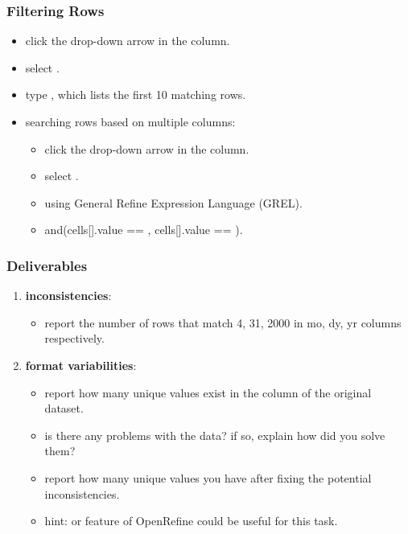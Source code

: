 \documentclass{beamer}					%
\begin{document}
\begin{frame}[c]
\frametitle{Filtering Rows}
\begin{itemize}
\item click the drop-down arrow in the  column.
\item select \say{\textcolor{red}{Text Filter}}.
\item type , which lists the first 10 matching rows.
\item searching rows based on multiple columns:
\begin{itemize}
\item click the drop-down arrow in the  column.
\item select \say{\textcolor{red}{Facet\textgreater Custom text facet...}}.
\item using General Refine Expression Language (GREL).
\item and(cells[].value == , cells[].value == ).
\end{itemize}
\end{itemize}
\end{frame}

 \begin{frame}[c]
 \frametitle{Deliverables}
 \begin{enumerate}
 \item \textbf{inconsistencies}: 
 \begin{itemize}
\item report the number of rows that match 4, 31, 2000 in mo, dy, yr columns respectively.
\end{itemize}
\item \textbf{format variabilities}:
\begin{itemize}
\item report how many unique values exist in the  column of the original dataset.
\item is there any problems with the data? if so, explain how did you solve them? 
\item report how many unique values you have after fixing the potential inconsistencies.
\item hint:  or  feature of OpenRefine could be useful for this task.
 \end{itemize}
\setcounter{enumTemp}{\theenumi}
 \end{enumerate}
\end{frame}
\end{document}
